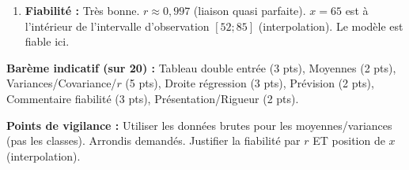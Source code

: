 \documentclass[11pt]{article}
\begin{document}
\begin{corrige}
\begin{enumerate}
\item \textbf{Fiabilité :} Très bonne. $r \approx 0,997$ (liaison quasi parfaite). $x=65$ est à l'intérieur de l'intervalle d'observation $[52; 85]$ (interpolation). Le modèle est fiable ici.
\end{enumerate}

\textbf{Barème indicatif (sur 20) :}
Tableau double entrée (3 pts), Moyennes (2 pts), Variances/Covariance/$r$ (5 pts), Droite régression (3 pts), Prévision (2 pts), Commentaire fiabilité (3 pts), Présentation/Rigueur (2 pts).

\textbf{Points de vigilance :} Utiliser les données brutes pour les moyennes/variances (pas les classes). Arrondis demandés. Justifier la fiabilité par $r$ ET position de $x$ (interpolation).
\end{corrige}
\end{document}
